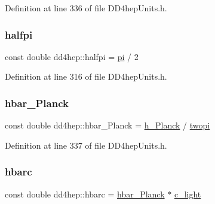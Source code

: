 Definition at line 336 of file D\+D4hep\+Units.\+h.

\hypertarget{namespacedd4hep_a6681c641778caec7c8626e0d666a1be7}{}\label{namespacedd4hep_a6681c641778caec7c8626e0d666a1be7} 
\subsubsection{\texorpdfstring{halfpi}{halfpi}}
{\footnotesize\ttfamily const double dd4hep\+::halfpi = \hyperlink{namespacedd4hep_ae71f82066d68af053eb8f60d0e13d3af}{pi} / 2\hspace{0.3cm}{\ttfamily [static]}}



Definition at line 316 of file D\+D4hep\+Units.\+h.

\hypertarget{namespacedd4hep_abb25342c5e225d62446e9546e412bdcf}{}\label{namespacedd4hep_abb25342c5e225d62446e9546e412bdcf} 
\subsubsection{\texorpdfstring{hbar\+\_\+\+Planck}{hbar\_Planck}}
{\footnotesize\ttfamily const double dd4hep\+::hbar\+\_\+\+Planck = \hyperlink{namespacedd4hep_a673d90bb18d025dec577177927fac9f0}{h\+\_\+\+Planck} / \hyperlink{namespacedd4hep_ae89c0c70c74b5fd0c1972865846822d7}{twopi}\hspace{0.3cm}{\ttfamily [static]}}



Definition at line 337 of file D\+D4hep\+Units.\+h.

\hypertarget{namespacedd4hep_aee6340c5f86bb7ae1edcc2a90efa056e}{}\label{namespacedd4hep_aee6340c5f86bb7ae1edcc2a90efa056e} 
\subsubsection{\texorpdfstring{hbarc}{hbarc}}
{\footnotesize\ttfamily const double dd4hep\+::hbarc = \hyperlink{namespacedd4hep_abb25342c5e225d62446e9546e412bdcf}{hbar\+\_\+\+Planck} $\ast$ \hyperlink{namespacedd4hep_abab5bebb73a5c3123d23fba7c326a0d5}{c\+\_\+light}\hspace{0.3cm}{\ttfamily [static]}}



